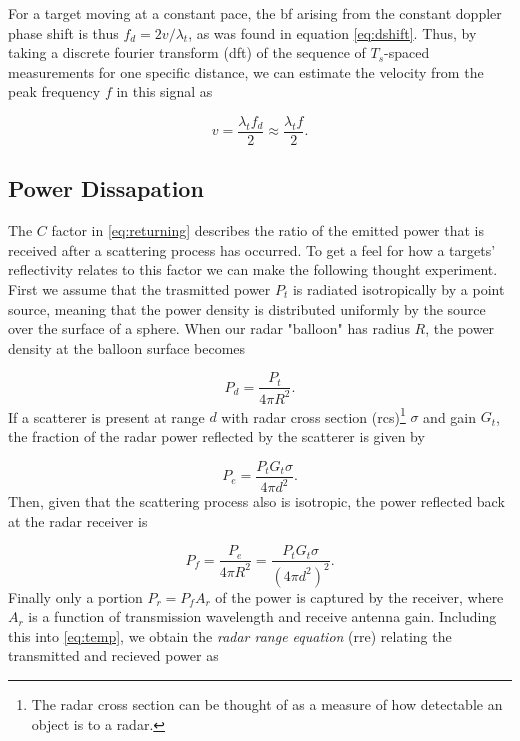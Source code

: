 For a target moving at a constant pace, the \gls{bf} arising from the constant doppler phase shift is thus $f_d = 2v/\lambda_t$, as was found in equation \ref{eq:dshift}. Thus, by taking a discrete fourier transform (\gls{dft}) of the sequence of $T_s$-spaced measurements for one specific distance, we can estimate the velocity from the peak frequency $f$ in this signal as 

\begin{equation}\label{eq:dopp}
	v = \frac{\lambda_t f_d}{2}
	\approx \frac{\lambda_t f}{2}.
\end{equation}


\subsection{Power Dissapation}

The $C$ factor in \ref{eq:returning} describes the ratio of the emitted power that is received after a scattering process has occurred. To get a feel for how a targets' reflectivity relates to this factor we can make the following thought experiment. First we assume that the trasmitted power $P_t$ is radiated isotropically by a point source, meaning that the power density is distributed uniformly by the source over the surface of a sphere. When our radar "balloon" has radius $R$, the power density at the balloon surface becomes  \citep{amin_2017}

\begin{equation}
	P_d 
	= \frac{P_t}{4\pi R^2}.
\end{equation}
If a scatterer is present at range $d$ with radar cross section (\gls{rcs})\footnote{The radar cross section can be thought of as a measure of how detectable an object is to a radar.} $\sigma$ and gain $G_t$, the fraction of the radar power reflected by the scatterer is given by 

\begin{equation}
	P_{e}
	= \frac{P_tG_t\sigma}{4\pi d^2}.
\end{equation}
Then, given that the scattering process also is isotropic, the power reflected back at the radar receiver is

\begin{equation}\label{eq:temp}
	P_f 
	= \frac{P_e}{4\pi R^2} 
	= \frac{P_t G_t \sigma}{(4\pi d^2)^2}.
\end{equation}
Finally only a portion $P_r = P_fA_r$ of the power is captured by the receiver, where $A_r$ is a function of transmission wavelength and receive antenna gain. Including this into \ref{eq:temp}, we obtain the \emph{radar range equation} (\gls{rre}) relating the transmitted and recieved power as

